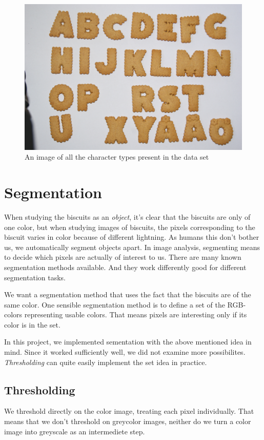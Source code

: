 \documentclass[a4paper,11pt]{article}
\begin{document}
\begin{figure}[]
\begin{center}
\includegraphics[width=140mm]{alphabet.JPG}
\end{center}
\caption{An image of all the character types present in the data set}
\label{fig:alphabet}
\end{figure}

\section{Segmentation}

When studying the biscuits as an \emph{object},
it's clear that the biscuits are only of one color,
but when studying images of biscuits, 
the pixels corresponding to the biscuit varies in color because of different lightning.
As humans this don't bother us, we automatically segment objects apart.
In image analysis, segmenting means to decide which pixels are actually of interest to us.
There are many known segmentation methods available.
And they work differently good for different segmentation tasks.

We want a segmentation method that uses the fact that the biscuits are of the same color.
One sensible segmentation method is to define a set of the RGB-colors representing usable colors.
That means pixels are interesting only if its color is in the set.

In this project, we implemented sementation with the above mentioned idea in mind.
Since it worked sufficiently well, we did not examine more possibilites. 
\emph{Thresholding} can quite easily implement the set idea in practice.

\subsection{Thresholding}
We threshold directly on the color image, treating each pixel individually. 
That means that we don't threshold on greycolor images,
neither do we turn a color image into greyscale as an intermediete step.
\end{document}
